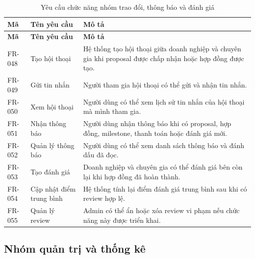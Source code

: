 \begin{longtable}{|p{2.0cm}|p{4.2cm}|p{7.6cm}|}
\caption{Yêu cầu chức năng nhóm trao đổi, thông báo và đánh giá}
\label{tab:fr-communication} \\ \hline
\textbf{Mã} & \textbf{Tên yêu cầu} & \textbf{Mô tả} \\ \hline
\endfirsthead
\hline
\textbf{Mã} & \textbf{Tên yêu cầu} & \textbf{Mô tả} \\ \hline
\endhead

FR-048 & Tạo hội thoại & Hệ thống tạo hội thoại giữa doanh nghiệp và chuyên gia khi proposal được chấp nhận hoặc hợp đồng được tạo. \\ \hline
FR-049 & Gửi tin nhắn & Người tham gia hội thoại có thể gửi và nhận tin nhắn. \\ \hline
FR-050 & Xem hội thoại & Người dùng có thể xem lịch sử tin nhắn của hội thoại mà mình tham gia. \\ \hline
FR-051 & Nhận thông báo & Người dùng nhận thông báo khi có proposal, hợp đồng, milestone, thanh toán hoặc đánh giá mới. \\ \hline
FR-052 & Quản lý thông báo & Người dùng có thể xem danh sách thông báo và đánh dấu đã đọc. \\ \hline
FR-053 & Tạo đánh giá & Doanh nghiệp và chuyên gia có thể đánh giá bên còn lại khi hợp đồng đã hoàn thành. \\ \hline
FR-054 & Cập nhật điểm trung bình & Hệ thống tính lại điểm đánh giá trung bình sau khi có review hợp lệ. \\ \hline
FR-055 & Quản lý review & Admin có thể ẩn hoặc xóa review vi phạm nếu chức năng này được triển khai. \\ \hline
\end{longtable}

\subsection{Nhóm quản trị và thống kê}

